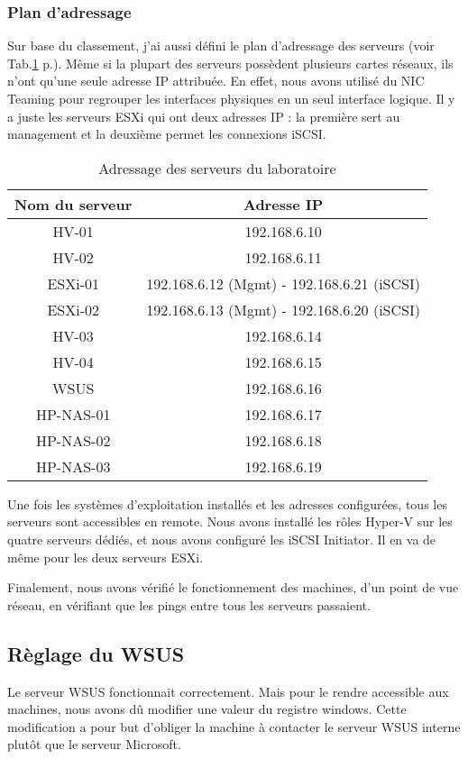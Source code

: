 \subsubsection{Plan d'adressage}
Sur base du classement, j'ai aussi défini le plan d'adressage des serveurs (voir Tab.\ref{tab:addIP} p.\pageref{tab:addIP}).
Même si la plupart des serveurs possèdent plusieurs cartes réseaux, ils n'ont qu'une seule adresse IP attribuée.
En effet, nous avons utilisé du NIC Teaming pour regrouper les interfaces physiques en un seul interface logique.
Il y a juste les serveurs ESXi qui ont deux adresses IP : la première sert au management et la deuxième permet les connexions iSCSI.
\begin{table}
\centering
\begin{tabular}{cc}
\toprule
Nom du serveur & Adresse IP \\
\midrule
HV-01 & 192.168.6.10 \\ 
HV-02 & 192.168.6.11 \\ 
ESXi-01 & 192.168.6.12 (Mgmt) - 192.168.6.21 (iSCSI) \\ 
ESXi-02 & 192.168.6.13 (Mgmt) - 192.168.6.20 (iSCSI) \\ 
HV-03 & 192.168.6.14 \\ 
HV-04 & 192.168.6.15 \\ 
WSUS & 192.168.6.16 \\ 
HP-NAS-01 & 192.168.6.17 \\ 
HP-NAS-02 & 192.168.6.18 \\ 
HP-NAS-03 & 192.168.6.19 \\
\bottomrule
\end{tabular}
\caption{Adressage des serveurs du laboratoire}
\label{tab:addIP}
\end{table}

Une fois les systèmes d'exploitation installés et les adresses configurées, tous les serveurs sont accessibles en remote. 
Nous avons installé les rôles Hyper-V sur les quatre serveurs dédiés, et nous avons configuré les iSCSI Initiator. 
Il en va de même pour les deux serveurs ESXi.

Finalement, nous avons vérifié le fonctionnement des machines, d'un point de vue réseau, en vérifiant que les pings entre tous les serveurs passaient. 


\subsection{Règlage du WSUS}
Le serveur WSUS fonctionnait correctement.
Mais pour le rendre accessible aux machines, nous avons dû modifier une valeur du registre windows.
Cette modification a pour but d'obliger la machine à contacter le serveur WSUS interne plutôt que le serveur Microsoft. 

